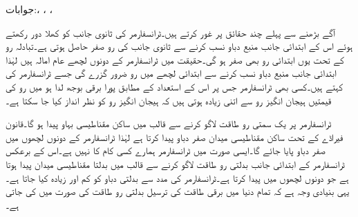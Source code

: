 جوابات:، ، ، 

آگے بڑھنے سے پہلے چند حقائق پر غور کرتے ہیں۔ٹرانسفارمر کی ثانوی جانب کو کھلا دور رکھتے ہوئے اس کے ابتدائی جانب منبع دباو نسب کرنے سے ثانوی جانب کی رو صفر حاصل ہوتی ہے۔تبادلہ رو کے تحت یوں ابتدائی رو بھی صفر ہو گی۔حقیقت میں ٹرانسفارمر کے دونوں لچھے عام امالہ ہیں لہٰذا ابتدائی جانب منبع دباو نسب کرنے سے ابتدائی لچھے میں رو ضرور گزرے گی جسے ٹرانسفارمر کی  کہتے ہیں۔کسی بھی ٹرانسفارمر جس پر اس کے استعداد کے مطابق پورا برقی بوجھ لدا ہو میں رو کی قیمتیں  ہیجان انگیز رو سے اتنی زیادہ ہوتی ہیں کہ ہیجان انگیز رو کو نظر انداز کیا جا سکتا ہے۔

ٹرانسفارمر پر یک سمتی رو طاقت لاگو کرنے سے قالب میں ساکن مقناطیسی بہاو پیدا ہو گا۔قانون فیراڈے کے تحت ساکن مقناطیسی میدان صفر دباو پیدا کرتا ہے لہٰذا ٹرانسفارمر کے دونوں لچھوں میں صفر دباو پایا جائے گا۔ایسی صورت میں ٹرانسفارمر ہمارے کسی کام کا نہیں ہے۔اس کے برعکس ٹرانسفارمر کے ابتدائی جانب بدلتی رو طاقت لاگو کرنے سے قالب میں بدلتا مقناطیسی میدان پیدا ہوتا ہے جو دونوں لچھوں میں   پیدا کرتا ہے۔ٹرانسفارمر کی مدد سے بدلتی دباو کو کم اور زیادہ کیا جاتا ہے۔یہی بنیادی وجہ ہے کہ تمام دنیا میں برقی طاقت کی ترسیل بدلتی رو طاقت کی صورت میں کی جاتی ہے۔

